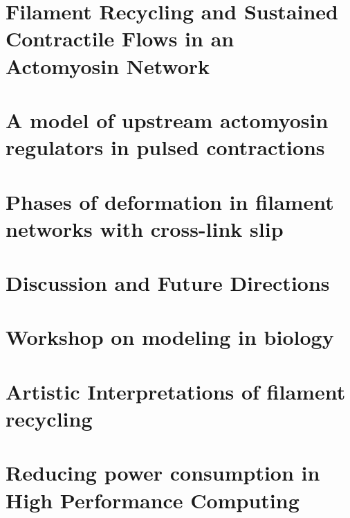 \documentclass{easychithesis}
\begin{document}
\chapter{Filament Recycling and Sustained Contractile Flows in an Actomyosin Network}


\chapter{A model of upstream actomyosin regulators in pulsed contractions}

\chapter{Phases of deformation in filament networks with cross-link slip}


\chapter{Discussion and Future Directions}

%
%
\appendix
\chapter{Workshop on modeling in biology}

\chapter{Artistic Interpretations of filament recycling}

\chapter{Reducing power consumption in High Performance Computing}

%
%

\singlespacing
\pagebreak


\end{document}
